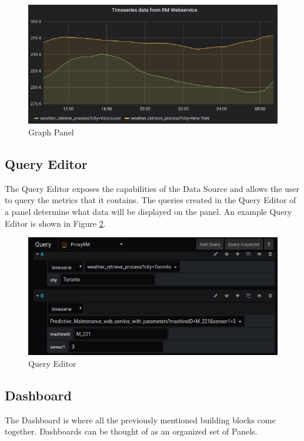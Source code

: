 \begin{figure}[h]
	\centering
	\includegraphics[width=130mm, keepaspectratio]{figures/graph-panel-medium.png}
	\caption{Graph Panel}
	\label{fig:graph-panel}
\end{figure}

\subsection{Query Editor}\label{query-editor}

The Query Editor exposes the capabilities of the Data Source and allows the user to query the metrics that it contains. The queries created in the Query Editor of a panel determine what data will be displayed on the panel. \cite{grafana-queryeditor} An example Query Editor is shown in Figure \ref{fig:query-editor}.

\begin{figure}[H]
	\centering
	\includegraphics[width=130mm, keepaspectratio]{figures/query-editor.png}
	\caption{Query Editor}
	\label{fig:query-editor}
\end{figure}

\subsection{Dashboard}
The Dashboard is where all the previously mentioned building blocks come together. Dashboards can be thought of as an organized set of Panels. \cite{grafana-dashboard}

